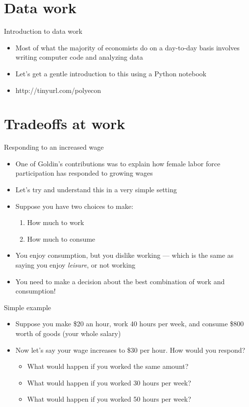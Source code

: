\documentclass[aspectratio=169]{beamer}
\begin{document}
\section{Data work}

\begin{frame}{Introduction to data work}
    \begin{itemize}
        \item Most of what the majority of economists do on a day-to-day basis involves writing computer code and analyzing data
        \item Let's get a gentle introduction to this using a Python notebook
        \item http://tinyurl.com/polyecon
    \end{itemize}
\end{frame}

\section{Tradeoffs at work}

\begin{frame}{Responding to an increased wage}
    \begin{itemize}
        \item One of Goldin's contributions was to explain how female labor force participation has responded to growing wages
        \item Let's try and understand this in a very simple setting
        \item Suppose you have two choices to make:
        \begin{enumerate}
            \item How much to work
            \item How much to consume
        \end{enumerate}
        \item You enjoy consumption, but you dislike working --- which is the same as saying you enjoy \textit{leisure}, or not working
        \item You need to make a decision about the best combination of work and consumption!
    \end{itemize}
\end{frame}

\begin{frame}{Simple example}
    \begin{itemize}
        \item Suppose you make \$20 an hour, work 40 hours per week, and consume \$800 worth of goods (your whole salary)
        \item Now let's say your wage increases to \$30 per hour. How would you respond?
        \begin{itemize}
            \item What would happen if you worked the same amount?
            \item What would happen if you worked 30 hours per week?
            \item What would happen if you worked 50 hours per week?
        \end{itemize}
    \end{itemize}
\end{frame}
\end{document}
